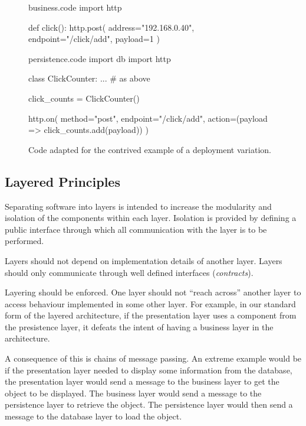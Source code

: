 \begin{figure}[H]
\begin{code}[style=python]{business.code}
import http

def click():
    http.post(
        address="192.168.0.40",
        endpoint="/click/add",
        payload=1
    )
\end{code}

\begin{code}[style=python]{persistence.code}
import db
import http

class ClickCounter:
    ... # as above

click_counts = ClickCounter()

http.on(
    method="post",
    endpoint="/click/add",
    action=(payload => click_counts.add(payload))
)
\end{code}
\caption{Code adapted for the contrived example of a deployment variation.}
\label{fig:uncommon-code}
\end{figure}

\subsection{Layered Principles}

Separating software into layers is intended to increase the modularity and isolation of the components within each layer.
Isolation is provided by defining a public interface through which all communication with the layer is to be performed.

\begin{definition}
    Layers should not depend on implementation details of another layer.
    Layers should only communicate through well defined interfaces (\emph{contracts}).
\end{definition}

Layering should be enforced. One layer should not ``reach across'' another layer to access behaviour implemented in some other layer.
For example, in our standard form of the layered architecture,
if the presentation layer uses a component from the presistence layer, it defeats the intent of having a business layer in the architecture.

A consequence of this is chains of message passing.
An extreme example would be if the presentation layer needed to display some information from the database,
the presentation layer would send a message to the business layer to get the object to be displayed.
The business layer would send a message to the persistence layer to retrieve the object.
The persistence layer would then send a message to the database layer to load the object.

